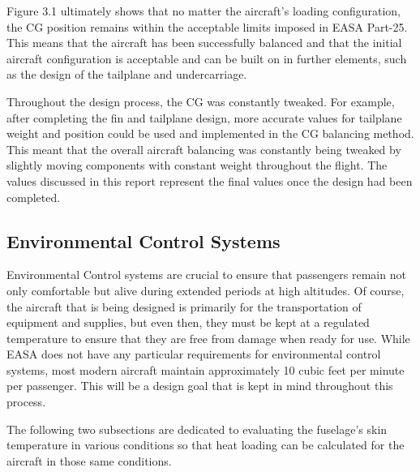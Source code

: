 \documentclass[stu, a4paper, 12pt, floatsintext]{apa7}
\numberwithin{figure}{section}
\numberwithin{table}{section}
\numberwithin{equation}{section}
\begin{document}
Figure 3.1 ultimately shows that no matter the aircraft's loading configuration, the CG position remains within the acceptable limits imposed in EASA Part-25. This means that the aircraft has been successfully balanced and that the initial aircraft configuration is acceptable and can be built on in further elements, such as the design of the tailplane and undercarriage. 

Throughout the design process, the CG was constantly tweaked. For example, after completing the fin and tailplane design, more accurate values for tailplane weight and position could be used and implemented in the CG balancing method. This meant that the overall aircraft balancing was constantly being tweaked by slightly moving components with constant weight throughout the flight. The values discussed in this report represent the final values once the design had been completed.  

\subsection{Environmental Control Systems}
Environmental Control systems are crucial to ensure that passengers remain not only comfortable but alive during extended periods at high altitudes. Of course, the aircraft that is being designed is primarily for the transportation of equipment and supplies, but even then, they must be kept at a regulated temperature to ensure that they are free from damage when ready for use. While EASA does not have any particular requirements for environmental control systems, most modern aircraft maintain approximately 10 cubic feet per minute per passenger. This will be a design goal that is kept in mind throughout this process. 

The following two subsections are dedicated to evaluating the fuselage’s skin temperature in various conditions so that heat loading can be calculated for the aircraft in those same conditions. 
\end{document}
